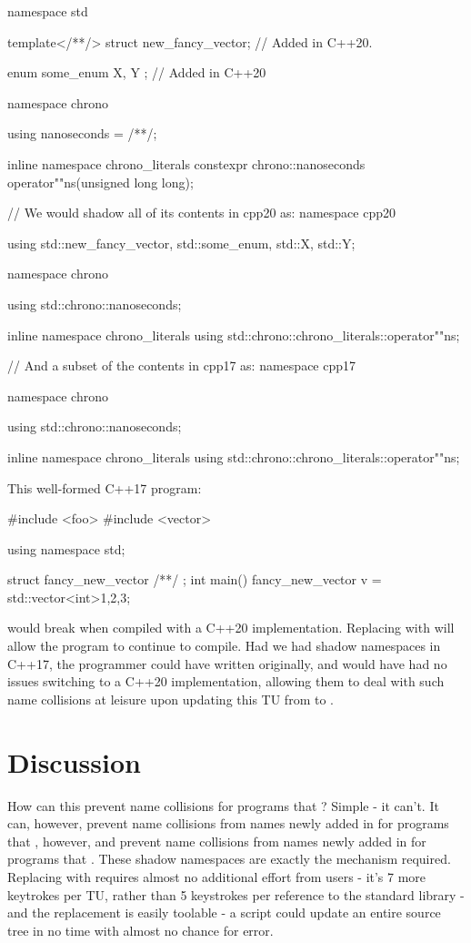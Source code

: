 \begin{codeblock}
namespace std {
  template</**/> struct new_fancy_vector; // Added in C++20.

  enum some_enum { X, Y }; // Added in C++20

  namespace chrono {
    using nanoseconds = /**/;

    inline namespace chrono_literals {
      constexpr chrono::nanoseconds operator""ns(unsigned long long);
    }
  }

  // We would shadow all of its contents in cpp20 as:
  namespace cpp20 {
    using std::new_fancy_vector, std::some_enum, std::X, std::Y;

    namespace chrono {
      using std::chrono::nanoseconds;

      inline namespace chrono_literals {
        using std::chrono::chrono_literals::operator""ns;
      }
    }
  }

  // And a subset of the contents in cpp17 as:
  namespace cpp17 {
    namespace chrono {
      using std::chrono::nanoseconds;

      inline namespace chrono_literals {
        using std::chrono::chrono_literals::operator""ns;
      }
    }
  }
}
\end{codeblock}

This well-formed C++17 program:
\begin{codeblock}
#include <foo>
#include <vector>

using namespace std;

struct fancy_new_vector { /**/ };
int main() {
  fancy_new_vector v = std::vector<int>{1,2,3};
}
\end{codeblock}

would break when compiled with a C++20 implementation. Replacing
 with  will allow
the program to continue to compile. Had we had shadow namespaces in C++17,
the programmer could have written  originally,
and would have had no issues switching to a C++20 implementation, allowing them
to deal with such name collisions at leisure upon updating this TU from
 to .

\section{Discussion}

How can this prevent name collisions for programs that
? Simple - it can't. It can, however, prevent name
collisions from names newly added in  for programs that
, however, and prevent name collisions
from names newly added in  for programs that
. These shadow namespaces are exactly the
mechanism required. Replacing  with
 requires almost no additional effort from
users - it's 7 more keytrokes per TU, rather than 5 keystrokes per reference to
the standard library - and the replacement is easily toolable - a 
script could update an entire source tree in no time with almost no chance for
error.

